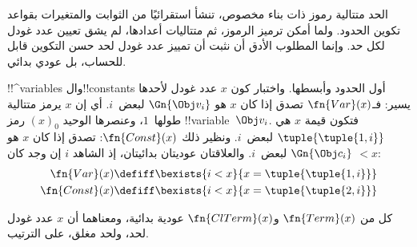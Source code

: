 \documentclass[../../../include/open-logic-section]{subfiles}
\begin{document}

\begin{explain}
الحد متتالية رموز ذات بناء مخصوص، تنشأ استقرائيًا
من الثوابت والمتغيرات بقواعد تكوين الحدود.
ولما أمكن ترميز الرموز، ثم متتاليات أعدادها،
لم يشق تعيين عدد غودل لكل حد. وإنما المطلوب
الأدق أن نثبت أن تمييز عدد غودل لحد حسن
التكوين قابل للحساب، بل عودي بدائي.
\end{explain}

!!^{variable}s وال!!{constant}s أول الحدود وأبسطها.
واختبار كون $x$ عدد غودل لأحدها يسير:
فـ$\fn{Var}(x)$ تصدق إذا كان $x$ هو
$\Gn{\Obj v_i}$ لبعض~$i$. أي إن $x$
يرمز متتالية طولها~$1$، وعنصرها الوحيد
$(x)_0$ رمز !!{variable}~$\Obj v_i$.
فتكون قيمة $x$ هي $\tuple{\tuple{1, i}}$
لبعض~$i$. ونظير ذلك $\fn{Const}(x)$:
تصدق إذا كان $x$ هو $\Gn{\Obj c_i}$
لبعض~$i$. والعلاقتان عوديتان بدائيتان،
إذ الشاهد $i$ إن وجد كان $< x$:
\begin{align*}
  \fn{Var}(x) & \defiff \bexists{i<x}{x = \tuple{\tuple{1, i}}}\\
  \fn{Const}(x) & \defiff \bexists{i<x}{x = \tuple{\tuple{2, i}}}
\end{align*}

\begin{prop}
كل من $\fn{Term}(x)$ و$\fn{ClTerm}(x)$ عودية بدائية،
ومعناهما أن $x$ عدد غودل لحد، ولحد مغلق، على الترتيب.
\end{prop}
\end{document}
